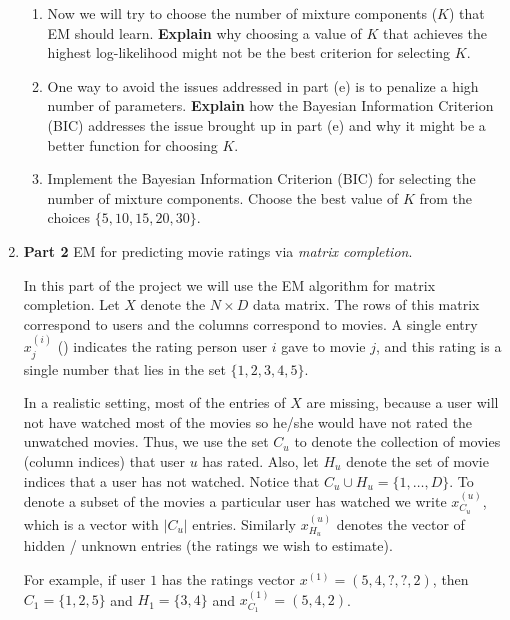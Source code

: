 \begin{enumerate}
\begin{enumerate}
\item Now we will try to choose the number of mixture components ($K$) that EM should learn. \textbf{Explain} why choosing a value of $K$ that achieves the highest log-likelihood might not be the best criterion for selecting $K$.

\item One way to avoid the issues addressed in part (e) is to penalize a high number of parameters. \textbf{Explain} how the Bayesian Information Criterion (BIC) addresses the issue brought up in part (e) and why it might be a better function for choosing $K$.

\item Implement the Bayesian Information Criterion (BIC) for selecting the number of mixture components. Choose the best value of $K$ from the choices $\{ 5, 10, 15, 20 , 30\}$.

\end{enumerate}

\item {\bf Part 2} EM for predicting movie ratings via \emph{matrix completion}.

In this part of the project we will use the EM algorithm for matrix completion. Let $X$ denote the $N \times D$ data matrix. The rows of this matrix correspond to users and the columns correspond to movies. A single entry $x^{(i)}_{j}$ () indicates the rating person user $i$ gave to movie $j$, and this rating is a single number that lies in the set $\{1,2,3,4,5\}$. 

In a realistic setting, most of the entries of $X$ are missing, because a user will not have watched most of the movies so he/she would have not rated the unwatched movies. Thus, we use the set $C_{u}$ to denote the collection of movies (column indices) that user $u$ has rated. Also, let $H_{u}$ denote the set of movie indices that a user has not watched. Notice that $C_{u} \cup H_{u} = \{1,\ldots,D\}$. To denote a subset of the movies a particular user has watched we write $x_{C_u}^{(u)}$, which is a vector with $|C_u|$ entries. Similarly $x_{H_u}^{(u)}$ denotes the vector of hidden / unknown entries (the ratings we wish to estimate).

For example, if user $1$ has the ratings vector $x^{(1)} =  (5, 4, ?, ?, 2)$, then $C_{1} = \{1, 2, 5\}$ and $H_{1} = \{ 3, 4\}$ and $x^{(1)}_{C_1} = (5, 4, 2)$.


\end{enumerate}
